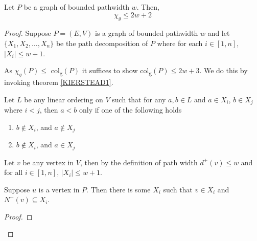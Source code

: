 \begin{theorem}
    Let $P$ be a graph of bounded pathwidth $w$. Then, 
    \[\chi_g \leq 2w + 2\]
    
\end{theorem}
\begin{proof}
    Suppose $P=(E,V)$ is a graph of bounded pathwidth $w$ and let $\{X_1,X_2,\dots,X_n\}$ be the path decomposition of $P$ where for each $i \in [1,n]$, $\left| X_i \right| \leq w + 1$.
    
    As $\chi_g(P) \leq$ col\textsubscript{g}$(P)$ it suffices to show col\textsubscript{g}$(P) \leq 2w + 3$. We do this by invoking theorem \ref{KIERSTEAD1}.
        
    Let $L$ be any linear ordering on $V$ such that for any $a,b \in L$ and $a \in X_i$, $b \in X_j$ where $i<j$, then $a<b$ only if one of the following holds
    \begin{enumerate}
        \item $b \notin X_i$, and $a \notin X_j$
        \item $b \notin X_i$, and $a \in X_j$
    \end{enumerate}
    
    
    
     
    Let $v$ be any vertex in $V$, then by the definition of path width $d^+(v) \leq w$ and for all $i \in [1,n]$, $ \left| X_i \right| \leq w + 1 $. 
    
    
    
    
    \begin{claim}
        Suppose $u$ is a vertex in $P$. Then there is some $X_i$ such that $v\in X_i$ and $N^-(v) \subseteq X_i$.
    \end{claim}
    
    \begin{proof}
        

\end{proof}
\end{proof}
